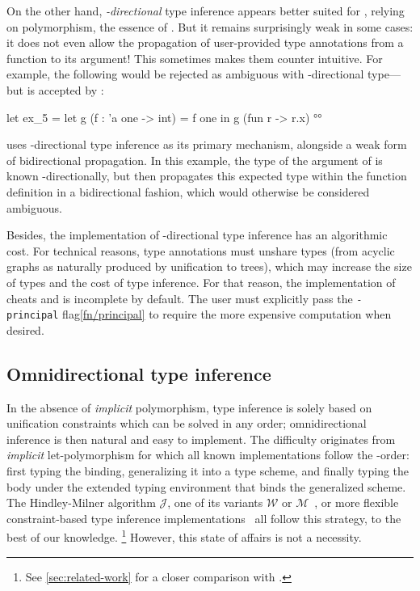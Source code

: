 \documentclass[acmsmall,screen,nonacm,review]{acmart}
\begin{document}
On the other hand, \emph{\Geninst-directional} type inference appears better
suited for \ML, relying on polymorphism, the essence of \ML. But it remains
surprisingly weak in some cases: it does not even allow the propagation of
user-provided type annotations from a function to its argument!
This sometimes makes them counter intuitive.
For example,
the following would be rejected as ambiguous with \geninst-directional
type---but is accepted by \OCaml:
\begin{program}
let ex_5 = let g (f : 'a one -> int) = f one in g (fun r -> r.x)$
$ °°
\end{program}
\OCaml uses \geninst-directional type inference as its primary mechanism,
alongside a weak form of bidirectional propagation. In this example, the type
of the argument of  is known \Geninst-directionally, but \OCaml then
propagates this expected type within the function definition
 in a bidirectional fashion, which would otherwise be
considered ambiguous.

Besides, the implementation of \geninst-directional type inference has an
algorithmic cost. For technical reasons, type annotations must unshare types
(from acyclic graphs as naturally produced by unification to trees), which
may increase the size of types and the cost of type inference. For that
reason, the implementation of \OCaml cheats and is incomplete by
default. The user must explicitly pass the \texttt{\small -principal}
flag\cref{fn/principal} to require the more expensive computation when
desired.

\subsection{Omnidirectional type inference}

In the absence of \emph{implicit} polymorphism, type inference is solely
based on unification constraints which can be solved in any order;
omnidirectional inference is then natural and easy to implement.  The
difficulty originates from \ML \emph{implicit} let-polymorphism for which
all known implementations follow the \geninst-order: first typing the
binding, generalizing it into a type scheme, and finally typing the body
under the extended typing environment that binds the generalized scheme.
The Hindley-Milner algorithm $\mathcal{J}$, one of its variants
$\mathcal{W}$ or $\mathcal{M}$~\citep* {Lee_Yi/algoM@toplas1998}, or more
flexible constraint-based type inference implementations~\citep*
{Remy/mleth,Remy/thesis, Odersky-Sulzmann-Wehr@tpos, Pottier-Remy/emlti} all
follow this strategy, to the best of our knowledge.\relax
\footnote {See \cref{sec:related-work} for a closer comparison with
\cite* {Pottier-Remy/emlti}.}
However, this state of affairs is not a necessity.
\end{document}

